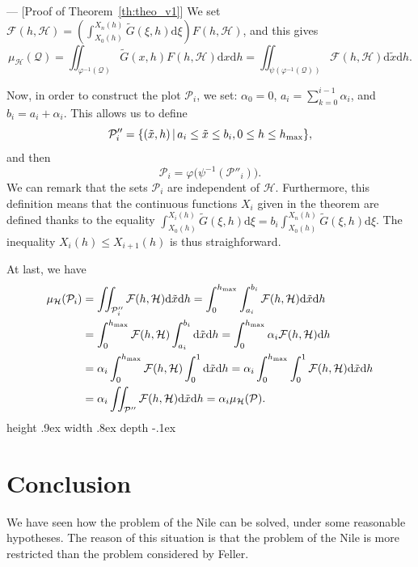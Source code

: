 \documentclass[A4paper, 12pt]{article}
\def\cH{\mathcal{H}}
\def\cP{\mathcal{P}}
\def\cQ{{\mathcal{Q}}}
\def\dd{{\mathrm{d}}}
\def\cF{\mathcal{F}}
\def\bull{\vrule height .9ex width .8ex depth -.1ex }
\newenvironment{proof}{\smallbreak\noindent{\sc Proof.} --- \rm}{\quad\bull\smallskip\rm}
\begin{document}
\begin{proof}[Proof of Theorem~\ref{th:theo_v1}]
We set $\mathcal{F}(h,\cH)=\left(\int_{X_{0}(h)}^{X_{n}(h)} \tilde
  G(\xi,h) \dd \xi\right) F(h,\cH)$, and this gives
  \begin{equation}\label{eq:tildeD}
  \mu_{\cH}(\cQ)=\iint_{\varphi^{-1}(\cQ)} \tilde G(x,h)F(h,\cH) \dd x\dd h=
  \iint_{\psi(\varphi^{-1}(\cQ))} \mathcal{F}(h,\cH)\dd\tilde x\dd h.
\end{equation}



Now, in order to construct the plot $\cP_i$, we set: $\alpha_0=0$, $a_i=\sum_{k=0}^{i-1} \alpha_i$, and  $b_i=a_i+\alpha_i$.
This allows us to define
$$\cP''_i=\{ (\tilde{x},h) \,|\,  a_i \leq \tilde{x} \leq b_i, 0 \leq h \leq h_{\rm max} \},$$ 
and  then
$$\cP_i=\varphi\big(\psi^{-1}(\cP''_i)\big).$$
We can remark that the sets $\cP_i$ are independent of $\mathcal{H}$.
Furthermore, this definition means that the continuous functions $X_i$ given in the theorem are defined thanks to the equality
$\int_{X_0(h)}^{X_i(h)} \tilde{G}(\xi,h)\dd\xi=b_i \int_{X_0(h)}^{X_n(h)} \tilde{G}(\xi,h)\dd\xi$. The inequality \mbox{$X_i(h) \leq X_{i+1}(h)$} is thus straighforward.


At last, we have
\begin{equation*}
\begin{split}  
\mu_{\cH}(\cP_{i})&=\iint_{\cP''_i} \mathcal{F}(h,\cH) \dd\tilde x\dd h =\int_{0}^{h_{\rm max}}
\int_{a_i}^{b_i}  \mathcal{F}(h,\cH)\dd\tilde
x\dd h\\
&=\int_{0}^{h_{\rm max}} \mathcal{F}(h,\cH) \int_{a_i}^{b_i} \dd\tilde
x\dd h =\int_{0}^{h_{\rm max}}
\alpha_i \mathcal{F}(h,\cH)  \dd h\\
&=\alpha_i \int_{0}^{h_{\rm max}} \mathcal{F}(h,\cH)  \int_{0}^1\dd\tilde x\dd h =\alpha_i \int_{0}^{h_{\rm max}}
\int_{0}^1 \mathcal{F}(h,\cH) \dd\tilde
x\dd h\\
&=\alpha_{i}\iint_{\cP''} \cF(h,\cH) \dd\tilde
x\dd h=\alpha_{i}\mu_{\cH}(\cP).
\end{split}
\end{equation*}
\end{proof}




\section*{Conclusion}
    
We have seen how the problem of the Nile can be solved, under some
reasonable hypotheses.  The reason of this situation is that the
problem of the Nile is more restricted than the problem considered by
Feller.
\end{document}
